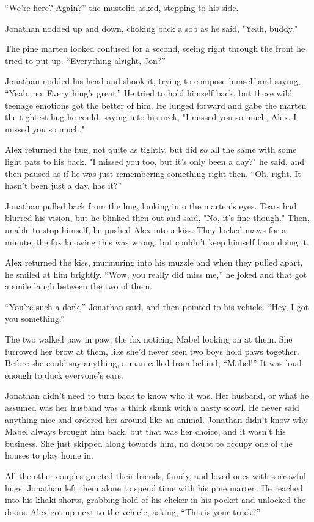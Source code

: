 ``We're here? Again?'' the mustelid asked, stepping to his side.

Jonathan nodded up and down, choking back a sob as he said, "Yeah,
buddy."

The pine marten looked confused for a second, seeing right through the
front he tried to put up. ``Everything alright, Jon?''

Jonathan nodded his head and shook it, trying to compose himself and
saying, ``Yeah, no. Everything's great.'' He tried to hold himself back,
but those wild teenage emotions got the better of him. He lunged forward
and gabe the marten the tightest hug he could, saying into his neck, "I
missed you so much, Alex. I missed you so much."

Alex returned the hug, not quite as tightly, but did so all the same
with some light pats to his back. "I missed you too, but it's only been
a day?" he said, and then paused as if he was just remembering something
right then. ``Oh, right. It hasn't been just a day, has it?''

Jonathan pulled back from the hug, looking into the marten's eyes. Tears
had blurred his vision, but he blinked then out and said, "No, it's fine
though." Then, unable to stop himself, he pushed Alex into a kiss. They
locked maws for a minute, the fox knowing this was wrong, but couldn't
keep himself from doing it.

Alex returned the kiss, murmuring into his muzzle and when they pulled
apart, he smiled at him brightly. ``Wow, you really did miss me,'' he
joked and that got a smile laugh between the two of them.

``You're such a dork,'' Jonathan said, and then pointed to his vehicle.
``Hey, I got you something.''

The two walked paw in paw, the fox noticing Mabel looking on at them.
She furrowed her brow at them, like she'd never seen two boys hold paws
together. Before she could say anything, a man called from behind,
``Mabel!'' It was loud enough to duck everyone's ears.

Jonathan didn't need to turn back to know who it was. Her husband, or
what he assumed was her husband was a thick skunk with a nasty scowl. He
never said anything nice and ordered her around like an animal. Jonathan
didn't know why Mabel always brought him back, but that was her choice,
and it wasn't his business. She just skipped along towards him, no doubt
to occupy one of the houses to play home in.

All the other couples greeted their friends, family, and loved ones with
sorrowful hugs. Jonathan left them alone to spend time with his pine
marten. He reached into his khaki shorts, grabbing hold of his clicker
in his pocket and unlocked the doors. Alex got up next to the vehicle,
asking, ``This is your truck?''

